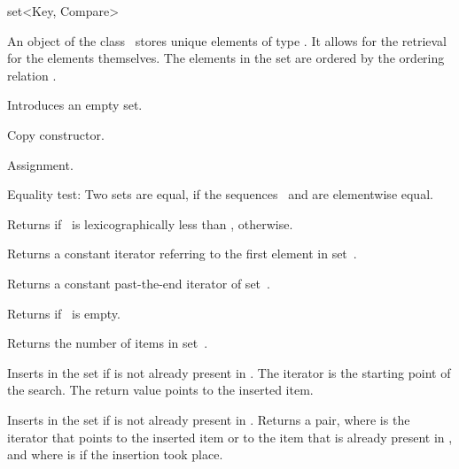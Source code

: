 
\ccHtmlNoClassLinks
\begin{ccClassTemplate} {set<Key, Compare>}


\ccDefinition
An object of the class \ccClassTemplateName\ stores unique elements of
type . It  allows for the retrieval for the elements
themselves. The elements in the set are ordered by the ordering
relation .



\ccTypes
{}

\ccCreation
{}


             {Introduces an empty set.}

 	    {Copy constructor.}

\ccOperations

        {Assignment.}

{Equality test: Two sets are equal, if the sequences \ccVar\ and 
 are elementwise equal.}


{Returns  if \ccVar\ is lexicographically less than ,
  otherwise.}

       {Returns a constant iterator referring to the first element in
        set~\ccVar.}

       {Returns a constant past-the-end iterator of set~\ccVar.}

	{Returns  if \ccVar\ is empty.}

	{Returns the number of items in set~\ccVar.}


{Inserts  in the set if  is not already
 present in \ccVar. The iterator  is the starting point of
 the search.  The return value points to the inserted item.}

{Inserts  in the set if  is not already
 present in \ccVar. Returns a pair, where 
 is the iterator that points to the inserted item or to the
 item that is already present in \ccVar, and where 
 is  if the insertion took place.}


\end{ccClassTemplate}
